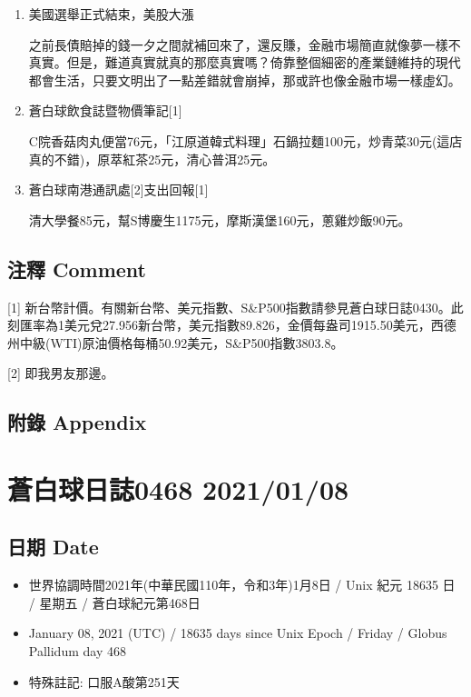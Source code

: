 \documentclass[a5paper, 10pt
]{book}
\providecommand{\tightlist}{%
  \setlength{\itemsep}{0pt}\setlength{\parskip}{0pt}}
\begin{document}
\begin{enumerate}
\def\labelenumi{\arabic{enumi}.}
\item
  美國選舉正式結束，美股大漲

  之前長債賠掉的錢一夕之間就補回來了，還反賺，金融市場簡直就像夢一樣不真實。但是，難道真實就真的那麼真實嗎？倚靠整個細密的產業鏈維持的現代都會生活，只要文明出了一點差錯就會崩掉，那或許也像金融市場一樣虛幻。
\item
  蒼白球飲食誌暨物價筆記{[}1{]}

  C院香菇肉丸便當76元，「江原道韓式料理」石鍋拉麵100元，炒青菜30元(這店真的不錯)，原萃紅茶25元，清心普洱25元。
\item
  蒼白球南港通訊處{[}2{]}支出回報{[}1{]}

  清大學餐85元，幫S博慶生1175元，摩斯漢堡160元，蔥雞炒飯90元。
\end{enumerate}

\hypertarget{ux6ce8ux91cb-comment-37}{%
\subsection{注釋 Comment}\label{ux6ce8ux91cb-comment-37}}

{[}1{]}
新台幣計價。有關新台幣、美元指數、S\&P500指數請參見蒼白球日誌0430。此刻匯率為1美元兌27.956新台幣，美元指數89.826，金價每盎司1915.50美元，西德州中級(WTI)原油價格每桶50.92美元，S\&P500指數3803.8。

{[}2{]} 即我男友那邊。

\hypertarget{ux9644ux9304-appendix-37}{%
\subsection{附錄 Appendix}\label{ux9644ux9304-appendix-37}}

\hypertarget{ux84bcux767dux7403ux65e5ux8a8c0468-20210108}{%
\section{蒼白球日誌0468
2021/01/08}\label{ux84bcux767dux7403ux65e5ux8a8c0468-20210108}}

\hypertarget{ux65e5ux671f-date-38}{%
\subsection{日期 Date}\label{ux65e5ux671f-date-38}}

\begin{itemize}
\tightlist
\item
  世界協調時間2021年(中華民國110年，令和3年)1月8日 / Unix 紀元 18635 日
  / 星期五 / 蒼白球紀元第468日
\item
  January 08, 2021 (UTC) / 18635 days since Unix Epoch / Friday / Globus
  Pallidum day 468
\item
  特殊註記: 口服A酸第251天
\end{itemize}
\end{document}

